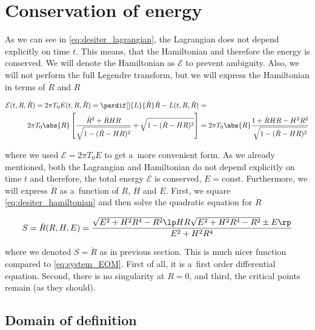 
\section{Conservation of energy}

As we can see in \cref{eq:desiter_lagrangian}, the Lagrangian does not depend explicitly on time $t$. This means, that the Hamiltonian and therefore the energy is conserved. We will denote the Hamiltonian as $\mathcal{E}$ to prevent ambiguity. Also, we will not perform the full Legendre transform, but we will express the Hamiltonian in terms of $\dot{R}$ and $R$

\begin{equation}
\label{eq:desiter_hamiltonian}
    \begin{aligned}
        \mathcal{E}(t, R, \dot{R}) = 2 \pi T_0 E(t, R, \dot{R}) = \pardif[] {L} {\dot{R}} \dot{R} - L(t, R, \dot{R}) & =  \\
        2 \pi T_0 \abs{R} \left[ \frac{\dot{R}^2 + \dot{R} HR}{\sqrt{1-(\dot{R}-HR)^2}} + \sqrt{1 - (\dot{R}-HR)^2}\right] & = 2 \pi T_0 \abs{R} \frac{1 + \dot{R}HR - H^2 R^2}{\sqrt{1-(\dot{R}-HR)^2}}
    \end{aligned}
\end{equation}


\noindent
where we used $\mathcal{E} = 2 \pi T_0 E$ to get a~more convenient form.
As we already mentioned, both the Lagrangian and Hamiltonian do not depend explicitly on time $t$ and therefore, the total energy $\mathcal{E}$ is conserved, $E = \text{const.}$ Furthermore, we will express $\dot{R}$ as a~function of $R$, $H$ and $E$. First, we square \cref{eq:desiter_hamiltonian} and then solve the quadratic equation for $\dot{R}$

\begin{equation}
\label{eq:desiter_S}
    S = \dot{R}(R, H, E) = \frac{\sqrt{E^2 + H^2 R^4 - R^2} \lp HR \sqrt{E^2 + H^2 R^4 - R^2} \pm E \rp}{E^2 + H^2 R^4}
\end{equation}

\noindent
where we denoted $S = \dot{R}$ as in previous section. This is much nicer function compared to \cref{eq:system_EOM}. First of all, it is a~first order differential equation. Second, there is no singularity at $R = 0$, and third, the critical points remain (as they should).

\subsection{Domain of definition}

